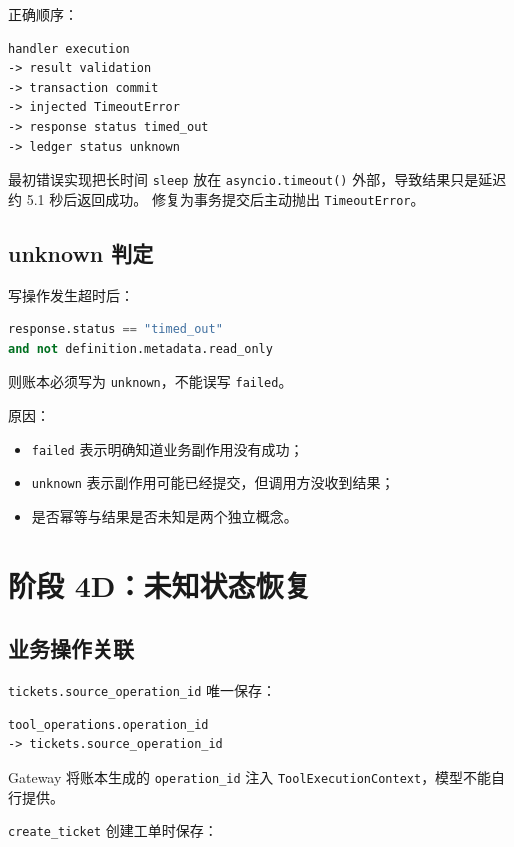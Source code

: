 \documentclass[11pt,a4paper]{ctexart}
\begin{document}
正确顺序：

\begin{lstlisting}
handler execution
-> result validation
-> transaction commit
-> injected TimeoutError
-> response status timed_out
-> ledger status unknown
\end{lstlisting}

最初错误实现把长时间 \texttt{sleep} 放在
\texttt{asyncio.timeout()} 外部，导致结果只是延迟约 5.1 秒后返回成功。
修复为事务提交后主动抛出 \texttt{TimeoutError}。

\subsection{unknown 判定}

写操作发生超时后：

\begin{lstlisting}[language=Python]
response.status == "timed_out"
and not definition.metadata.read_only
\end{lstlisting}

则账本必须写为 \texttt{unknown}，不能误写 \texttt{failed}。

原因：

\begin{itemize}[leftmargin=2em]
  \item \texttt{failed} 表示明确知道业务副作用没有成功；
  \item \texttt{unknown} 表示副作用可能已经提交，但调用方没收到结果；
  \item 是否幂等与结果是否未知是两个独立概念。
\end{itemize}

\section{阶段 4D：未知状态恢复}

\subsection{业务操作关联}

\texttt{tickets.source\_operation\_id} 唯一保存：

\begin{lstlisting}
tool_operations.operation_id
-> tickets.source_operation_id
\end{lstlisting}

Gateway 将账本生成的 \texttt{operation\_id} 注入
\texttt{ToolExecutionContext}，模型不能自行提供。

\texttt{create\_ticket} 创建工单时保存：
\end{document}
